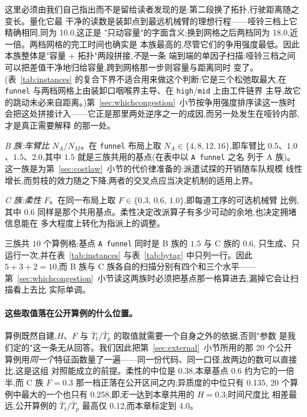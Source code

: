 \documentclass[manuscript,screen,review]{acmart}
\newcommand{\NCases}{10}
\newcommand{\LegDumbbell}{10.0}          %
\newcommand{\LegGrid}{18.0}              %
\newcommand{\PubFMed}{0.38}              %
\newcommand{\PubHMed}{0.135}             %
\newcommand{\PubHMax}{0.258}             %
\newcommand{\PubTtTpHi}{0.12}            %
\newcommand{\PubNInst}{20}
\begin{document}
这里必须由我们自己指出而不是留给读者发现的是:第二段换了拓扑,行驶距离随之变长。量化它最
干净的读数是装卸点到最远机械臂的理想行程——哑铃三档上它精确相同,同为 \LegDumbbell{},这正是
"只动容量"的字面含义;换到网格之后两档同为 \LegGrid{},近一倍。两档网格的完工时间也确实是
本族最高的,尽管它们的争用强度最低。因此本族整体是"容量 $+$ 拓扑"两段拼接,\emph{不}是一条
端到端的单因子扫描:哑铃三档之间可以把差值干净地归给容量,跨到网格那一步则容量与距离同时
变了。(表~\ref{tab:instances} 的复合下界不适合用来做这个判断:它是三个松弛取最大,在
\texttt{funnel} 与两档网格上由装卸口咽喉界主导、在 \texttt{high}/\texttt{mid} 上由工件链界
主导,故它的跳动未必来自距离。)第~\ref{sec:whichcongestion}~小节按争用强度排序读这一族时
会把这处拼接计入——它正是那里两处逆序之一的成因,而另一处发生在哑铃内部,才是真正需要解释
的那一处。

\emph{B 族:车臂比 $N_A/N_M$}。在 \texttt{funnel} 布局上取 $N_A\in\{4,8,12,16\}$,即车臂比
$0.5$、$1.0$、$1.5$、$2.0$,其中 $1.5$ 就是三族共用的基点(在表中以 \texttt{A funnel} 之名
列于 A 族)。这一族是为第~\ref{sec:costlaw}~小节的代价律准备的:派遣试探的开销随车队规模
线性增长,而剪枝的效力随之下降,两者的交叉点应当决定机制的适用上界。

\emph{C 族:柔性 $F$}。在同一布局上取 $F\in\{0.3,\,0.6,\,1.0\}$,即每道工序的可选机械臂
比例,其中 $0.6$ 同样是那个共用基点。柔性决定改派算子有多少可动的余地,也决定拥堵信息能在
多大程度上转化为指派上的调整。

三族共 $\NCases$ 个算例格:基点 \texttt{A funnel} 同时是 B 族的 $1.5$ 与 C 族的 $0.6$,
只生成、只运行一次,并在表~\ref{tab:instances} 与表~\ref{tab:bytag} 中只列一行。因此
$5+3+2=\NCases$,而 B 族与 C 族各自的扫描分别有四个和三个水平——
第~\ref{sec:whichcongestion}~小节读这两族时必须把基点那一格算进去,漏掉它会让扫描看上去比
实际单调。

\paragraph{这些取值落在公开算例的什么位置。}
算例既然自建,$H$、$F$ 与 $\bar{T}_t/\bar{T}_p$ 的取值就需要一个自身之外的依据,否则"参数
是我们定的"这一条无从回答。我们因此把第~\ref{sec:external}~小节所用的那 \PubNInst{} 个公开
算例用\emph{同一个}特征函数量了一遍——同一份代码、同一口径,故两边的数可以直接比,这是这组
对照能成立的前提。柔性的中位是 \PubFMed{},本章基点
$0.6$ 约为它的一倍半,而 C 族 $F=0.3$ 那一档正落在公开区间之内;异质度的中位只有 \PubHMed{},
\PubNInst{} 个算例中最大的一个也只有 \PubHMax{},即\emph{无一}达到本章共用的 $H=0.3$;时间尺度比
相差最远,公开算例的 $\bar{T}_t/\bar{T}_p$ 最高仅 \PubTtTpHi{},而本章标定到 $4.0$。
\end{document}
